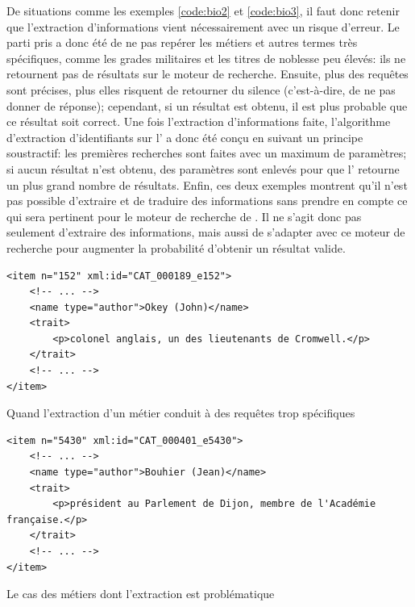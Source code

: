 De situations comme les exemples \ref{code:bio2} et \ref{code:bio3}, il faut donc retenir que l'extraction d'informations vient nécessairement avec un risque d'erreur. Le parti pris a donc été de ne pas repérer les métiers et autres termes très spécifiques, comme les grades militaires et les titres de noblesse peu élevés: ils ne retournent pas de résultats sur le moteur de recherche. Ensuite, plus des requêtes sont précises, plus elles risquent de retourner du silence (c'est-à-dire, de ne pas donner de réponse); cependant, si un résultat est obtenu, il est plus probable que ce résultat soit correct. Une fois l'extraction d'informations faite, l'algorithme d'extraction d'identifiants sur l'\api{} \wkd{} a donc été conçu en suivant un principe soustractif: les premières recherches sont faites avec un maximum de paramètres; si aucun résultat n'est obtenu, des paramètres sont enlevés pour que l'\api{} retourne un plus grand nombre de résultats. Enfin, ces deux exemples montrent qu'il n'est pas possible d'extraire et de traduire des informations sans prendre en compte ce qui sera pertinent pour le moteur de recherche de \wkd{}. Il ne s'agit donc pas seulement d'extraire des informations, mais aussi de s'adapter avec ce moteur de recherche pour augmenter la probabilité d'obtenir un résultat valide.

\begin{listing}
	\begin{verbatim}
<item n="152" xml:id="CAT_000189_e152">
	<!-- ... -->
	<name type="author">Okey (John)</name>
	<trait>
		<p>colonel anglais, un des lieutenants de Cromwell.</p>
	</trait>
	<!-- ... -->
</item>
	\end{verbatim}
	\caption{Quand l'extraction d'un métier conduit à des requêtes trop spécifiques}
	\label{code:bio2}
\end{listing}

\begin{listing}
	\begin{verbatim}
<item n="5430" xml:id="CAT_000401_e5430">
	<!-- ... -->
	<name type="author">Bouhier (Jean)</name>
	<trait>
		<p>président au Parlement de Dijon, membre de l'Académie française.</p>
	</trait>
	<!-- ... -->
</item>
	\end{verbatim}
	\caption{Le cas des métiers dont l'extraction est problématique}
	\label{code:bio3}
\end{listing}


